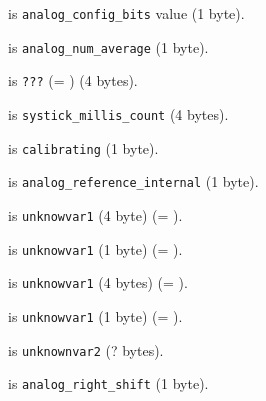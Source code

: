  is \texttt{analog\_config\_bits} value (1 byte).

 is \texttt{analog\_num\_average} (1 byte).

 is \texttt{???} (= ) (4 bytes).

 is \texttt{systick\_millis\_count} (4 bytes).

 is \texttt{calibrating} (1 byte).

 is \texttt{analog\_reference\_internal} (1 byte).

 is \texttt{unknowvar1} (4 byte) (= ).

 is \texttt{unknowvar1} (1 byte) (= ).

 is \texttt{unknowvar1} (4 bytes) (= ).

 is \texttt{unknowvar1} (1 byte) (= ).

 is \texttt{unknownvar2} (? bytes).

 is \texttt{analog\_right\_shift} (1 byte).
